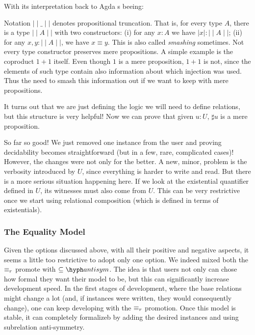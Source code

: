   
  With its interpretation back to Agda s beeing:
   
  
  Notation $\mid\mid\_\mid\mid$ denotes propositional truncation. That is, for every type $A$,
  there is a type $\mid\mid A \mid\mid$ with two constructors: (i) for any $x : A$ we have
  $\mid x \mid : \mid\mid A \mid\mid$; (ii) for any $x , y : \mid\mid A \mid\mid$, we have
  $x \equiv y$. This is also called \emph{smashing} sometimes. Not every type constructor 
  preserves mere propositions. A simple example is the coproduct
  $1 + 1$ itself. Even though $1$ is a mere proposition, $1 + 1$ is not, since the elements of such type
  contain also information about which injection was used. Thus the need to smash this information out
  if we want to keep with mere propositions.
  
  It turns out that we are just defining the logic we will need to define relations, but this
  structure is very helpful! Now we can prove that given $u : U$, $\sharp u$ is a mere proposition.
  
  
  So far so good! We just removed one instance from the user and proving decidability becomes
  straightforward (but in a few, rare, complicated cases)! However, the changes were not only for the better.
  A new, minor, problem is the verbosity introduced by $U$, since everything is harder to write and read.
  But there is a more serious situation happening here. If we look at the existential quantifier defined in $U$,
  its witnesses must also come from $U$. This can be very restrictive once we start using relational
  composition (which is defined in terms of existentials).

\subsubsection{The Equality Model}
  
  Given the options discussed above, with all their positive and negative aspects, it seems
  a little too restrictive to adopt only one option. We indeed mixed both the $\equiv_r$ promote
  with $\subseteq\hyph antisym$. The idea is that users not only can chose how formal they want their model
  to be, but this can significantly increase development speed. In the first stages of development, where
  the base relations might change a lot (and, if instances were written, they would consequently change),
  one can keep developing with the $\equiv_r$ promotion. Once this model is stable, it can completely
  formalizeb by adding the desired instances and using subrelation anti-symmetry.

